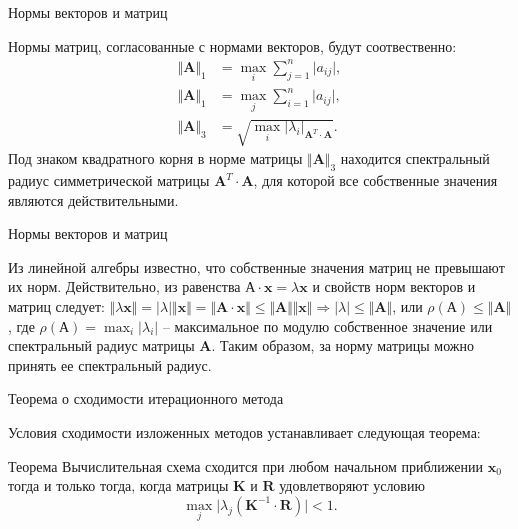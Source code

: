 \documentclass[10pt,xcolor=pst,aspectratio=169]{beamer}
\begin{document}
\begin{frame}{Нормы векторов и матриц}

	\transdissolve[duration=0.2]
	\justifying
	Нормы матриц, согласованные с нормами векторов, будут соотвественно:
	\[
		\begin{split}
			\Vert \textbf{A} \Vert_{1} &= \max_{i} \sum_{j = 1}^{n} \vert a_{ij} \vert , \\
			\Vert \textbf{A} \Vert_{1} &= \max_{j} \sum_{i = 1}^{n} \vert a_{ij} \vert , \\
			\Vert \textbf{A} \Vert_{3} &= \sqrt{\max_{i} \vert \lambda_{i} \vert_{\textbf{A}^{T} \cdot \textbf{A}}} .
		\end{split}
	\]
	Под знаком квадратного корня в норме матрицы $\Vert \textbf{A} \Vert_{3}$ находится спектральный радиус симметрической матрицы $\textbf{A}^{T} \cdot \textbf{A}$, для которой все собственные значения являются действительными.

\end{frame}

\begin{frame}{Нормы векторов и матриц}

	\transdissolve[duration=0.2]
	\justifying
	\large
	Из линейной алгебры известно, что собственные значения матриц не превышают их норм. Действительно, из равенства $\textbf{А} \cdot \textbf{x} = \lambda \textbf{x}$ и свойств норм векторов и матриц следует: $\Vert \lambda \textbf{x} \Vert = \vert \lambda \vert \Vert \textbf{x} \Vert = \Vert \textbf{A} \cdot \textbf{x} \Vert \leq \Vert \textbf{A} \Vert \Vert \textbf{x} \Vert \Rightarrow \vert \lambda \vert \leq \Vert \textbf{A} \Vert$, или $\rho(\textbf{А}) \leq \Vert \textbf{A} \Vert$, где $\rho(\textbf{А}) = \max_{i} \vert \lambda_{i} \vert$ -- максимальное по модулю собственное значение или спектральный радиус матрицы $\textbf{A}$. Таким образом, за норму матрицы можно принять ее спектральный радиус.

\end{frame}

\begin{frame}{Теорема о сходимости итерационного метода}

	\transdissolve[duration=0.2]
	\justifying
	\large
	Условия сходимости изложенных методов устанавливает следующая теорема:
	\begin{block}{Теорема}
		\justifying
		Вычислительная схема сходится при любом начальном приближении $\textbf{x}_{0}$ тогда и только тогда, когда матрицы $\textbf{K}$ и $\textbf{R}$ удовлетворяют условию
		\[
			\max_{j} \vert \lambda_{j} (\textbf{K}^{-1} \cdot \textbf{R}) \vert < 1.
		\]
	\end{block}

\end{frame}
\end{document}
